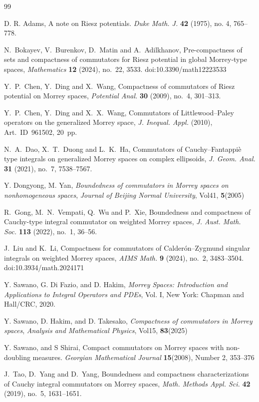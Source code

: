 \documentclass[11pt,a4]{article}
\numberwithin{equation}{section}
\theoremstyle{definition}
\theoremstyle{remark}
\begin{document}
\noindent
\begin{thebibliography}{99}

D. R. Adams, A note on Riesz potentials. \textit{Duke Math. J.} \textbf{42} (1975), no. 4, 765--778.

N.~Bokayev, V.~Burenkov, D.~Matin and A.~Adilkhanov,
Pre-compactness of sets and compactness of commutators for Riesz potential in global Morrey-type spaces,
\textit{Mathematics} \textbf{12} (2024), no.~22, 3533.
doi:10.3390/math12223533

Y.~P.~Chen, Y.~Ding and X.~Wang,
Compactness of commutators of Riesz potential on Morrey spaces,
\textit{Potential Anal.} \textbf{30} (2009), no.~4, 301--313.

Y.~P.~Chen, Y.~Ding and X.~X.~Wang,
Commutators of Littlewood--Paley operators on the generalized Morrey space,
\textit{J. Inequal. Appl.} (2010), Art.~ID~961502, 20~pp.

N.~A.~Dao, X.~T.~Duong and L.~K.~Ha,
Commutators of Cauchy--Fantappi\`e type integrals on generalized Morrey spaces on complex ellipsoids,
\textit{J. Geom. Anal.} \textbf{31} (2021), no.~7, 7538--7567.

Y. Dongyong, M. Yan, \textit{Boundedness of commutators in Morrey spaces on nonhomogeneous spaces}, \textit{Journal of Beijing Normal University}, Vol41, \textbf{5}(2005)

R.~Gong, M.~N.~Vempati, Q.~Wu and P.~Xie,
Boundedness and compactness of Cauchy-type integral commutator on weighted Morrey spaces,
\textit{J. Aust. Math. Soc.} \textbf{113} (2022), no.~1, 36--56.

J.~Liu and K.~Li,
Compactness for commutators of Calderón--Zygmund singular integrals on weighted Morrey spaces,
\textit{AIMS Math.} \textbf{9} (2024), no.~2, 3483--3504.
doi:10.3934/math.2024171

Y. Sawano, G. Di Fazio, and D. Hakim, \textit{Morrey Spaces: Introduction and Applications to Integral Operators and PDEs}, Vol. I, New York: Chapman and Hall/CRC, 2020.

Y. Sawano, D. Hakim, and D. Takesako, \textit{Compactness of commutators in Morrey spaces}, \textit{Analysis and Mathematical Physics}, Vol15, \textbf{83}(2025)

Y. Sawano, and S Shirai, Compact commutators on Morrey spaces with non-doubling measures. \textit{Georgian Mathematical Journal} \textbf{15}(2008), Number 2, 353–376

J.~Tao, D.~Yang and D.~Yang,
Boundedness and compactness characterizations of Cauchy integral commutators on Morrey spaces,
\textit{Math. Methods Appl. Sci.} \textbf{42} (2019), no.~5, 1631--1651.



\end{thebibliography}
\end{document}
